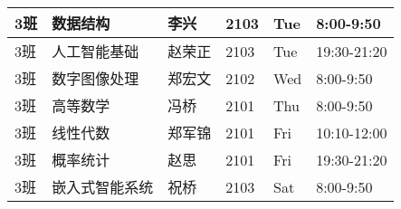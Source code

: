 \documentclass{ctexart}
\begin{document}
\begin{table}[htbp]
\begin{tabular}{|l|l|l|l|l|l|}
		\hline
		3班 & 数据结构 & 李兴 & 2103 & Tue & 8:00-9:50 \\
		\hline
		3班 & 人工智能基础 & 赵荣正 & 2103 & Tue & 19:30-21:20 \\
		\hline
		3班 & 数字图像处理 & 郑宏文 & 2102 & Wed & 8:00-9:50 \\
		\hline
		3班 & 高等数学 & 冯桥 & 2101 & Thu & 8:00-9:50 \\
		\hline
		3班 & 线性代数 & 郑军锦 & 2101 & Fri & 10:10-12:00 \\
		\hline
		3班 & 概率统计 & 赵思 & 2101 & Fri & 19:30-21:20 \\
		\hline
		3班 & 嵌入式智能系统 & 祝桥 & 2103 & Sat & 8:00-9:50 \\
		\hline
		\end{tabular}
	\end{table}
	
	\newpage
\end{document}
